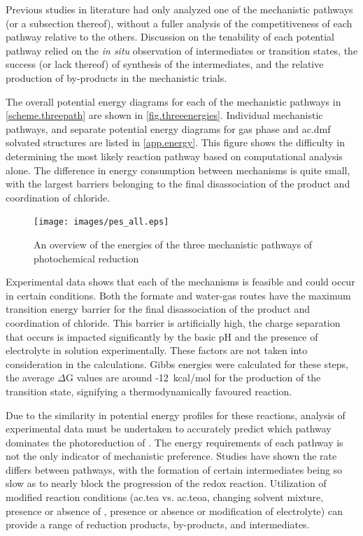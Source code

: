
Previous studies in literature had only analyzed one of the mechanistic pathways (or a subsection thereof), without a fuller analysis of the competitiveness of each pathway relative to the others. Discussion on the tenability of each potential pathway relied on the \textit{in situ} observation of intermediates or transition states, the success (or lack thereof) of synthesis of the intermediates, and the relative production of by-products in the mechanistic trials. 

The overall potential energy diagrams for each of the mechanistic pathways in \autoref{scheme.threepath} are shown in \autoref{fig.threeenergies}. Individual mechanistic pathways, and separate potential energy diagrams for gas phase and \gls{ac.dmf} solvated structures are listed in \autoref{app.energy}. This figure shows the difficulty in determining the most likely reaction pathway based on computational analysis alone. The difference in energy consumption between mechanisms is quite small, with the largest barriers belonging to the final disassociation of the product and coordination of chloride. 

\begin{figure}[!htbp]
 \begin{center}
  \texttt{[image: images/pes\_all.eps]}
 \end{center}
\caption[Reaction energies for three mechanistic pathways]{An overview of the energies of the three mechanistic pathways of photochemical  reduction}
\label{fig.threeenergies}
\end{figure} 

Experimental data shows that each of the mechanisms is feasible and could occur in certain conditions. Both the formate and water-gas routes have the maximum transition energy barrier for the final disassociation of the product and coordination of chloride. This barrier is artificially high, the charge separation that occurs is impacted significantly by the basic pH and the presence of electrolyte in solution experimentally. These factors are not taken into consideration in the calculations. Gibbs energies were calculated for these steps, the average $\Delta$G values are around -12~kcal/mol for the production of the transition state, signifying a thermodynamically favoured reaction. 

Due to the similarity in potential energy profiles for these reactions, analysis of experimental data must be undertaken to accurately predict which pathway dominates the photoreduction of . The energy requirements of each pathway is not the only indicator of mechanistic preference. Studies have shown the rate differs between pathways, with the formation of certain intermediates being so slow as to nearly block the progression of the redox reaction. Utilization of modified reaction conditions (\gls{ac.tea} vs. \gls{ac.teoa}, changing solvent mixture, presence or absence of , presence or absence or modification of electrolyte) can provide a range of reduction products, by-products, and intermediates\autocite{hawecker1983, hawecker1986, sullivan1985, hayashi2003, morris2009, morimoto2013}.

